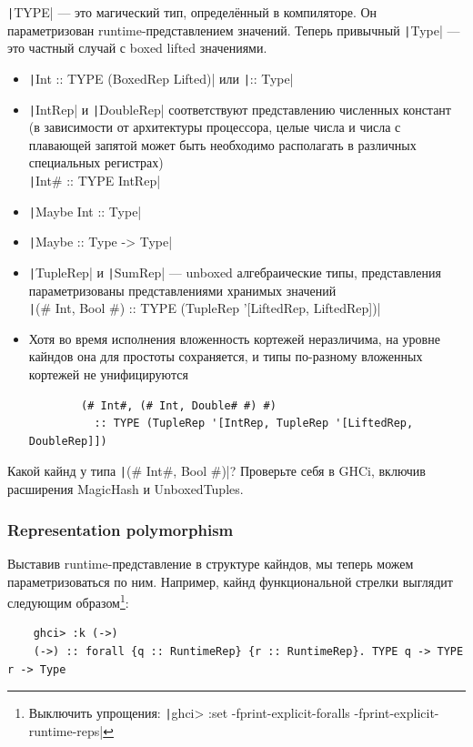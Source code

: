 \texttt|TYPE| --- это магический тип, определённый в компиляторе.
Он параметризован runtime-представлением значений.
Теперь привычный \texttt|Type| --- это частный случай с boxed lifted значениями.

\begin{itemize}
    \item \texttt|Int :: TYPE (BoxedRep Lifted)| или \texttt|:: Type|
    \item \texttt|IntRep| и \texttt|DoubleRep| соответствуют представлению численных констант (в зависимости от архитектуры процессора, целые числа и числа с плавающей запятой может быть необходимо располагать в различных специальных регистрах)\\ \texttt|Int# :: TYPE IntRep|
    \item \texttt|Maybe Int :: Type|
    \item \texttt|Maybe :: Type -> Type|
    \item \texttt|TupleRep| и \texttt|SumRep| --- unboxed алгебраические типы, представления параметризованы представлениями хранимых значений\\
    \texttt|(# Int, Bool #) :: TYPE (TupleRep '[LiftedRep, LiftedRep])|
    \item Хотя во время исполнения вложенность кортежей неразличима, на уровне кайндов она для простоты сохраняется, и типы по-разному вложенных кортежей не унифицируются
    \begin{verbatim}
        (# Int#, (# Int, Double# #) #)
          :: TYPE (TupleRep '[IntRep, TupleRep '[LiftedRep, DoubleRep]])
    \end{verbatim}
\end{itemize}

\begin{task}
    Какой кайнд у типа \texttt|(# Int#, Bool #)|?
    Проверьте себя в GHCi, включив расширения MagicHash и UnboxedTuples.
\end{task}

\subsubsection{Representation polymorphism}

Выставив runtime-представление в структуре кайндов, мы теперь можем параметризоваться по ним.
Например, кайнд функциональной стрелки выглядит следующим образом\footnote{Выключить упрощения: \texttt|ghci> :set -fprint-explicit-foralls -fprint-explicit-runtime-reps|}:
\begin{verbatim}
    ghci> :k (->)
    (->) :: forall {q :: RuntimeRep} {r :: RuntimeRep}. TYPE q -> TYPE r -> Type
\end{verbatim}

